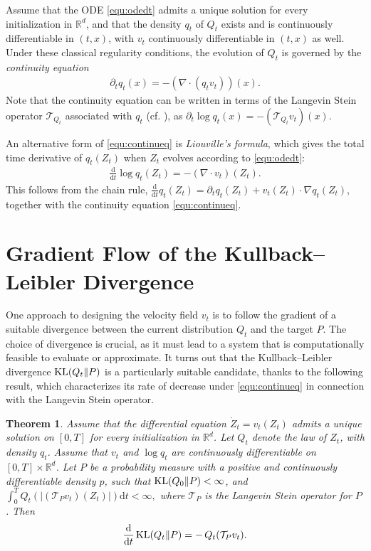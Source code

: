 \documentclass[12pt,paper=letter]{scrreprt}
\newtheorem{theorem}{Theorem}[chapter]
\newcommand{\RR}{\mathbb{R}}
\def\KL#1#2{\textnormal{KL}({#1}\Vert{#2})}
\newcommand{\df}{\mathrm{d}}
\begin{document}
Assume that the ODE \eqref{equ:odedt} admits a unique solution for every initialization in $\RR^d$,
and that the density $q_t$ of $Q_t$ exists and is continuously differentiable in $(t,x)$, with
$v_t$ continuously differentiable in $(t,x)$ as well.
Under these classical regularity conditions, the evolution of $Q_t$ is governed by the
\emph{continuity equation}
\begin{align}\label{equ:continueq}
\partial_t q_t(x)
=
- (\nabla \cdot (q_t v_t))(x).
\end{align}
Note that the continuity equation can be written in terms of the Langevin Stein operator $\mathcal{T}_{Q_t}$ associated with $q_t$ (cf. ), as
$\partial_t \log q_t(x) = - (\mathcal{T}_{Q_t} v_t)(x)$.


An alternative form of \eqref{equ:continueq} is \emph{Liouville’s formula}, which gives the total time derivative of $q_t(Z_t)$ when $Z_t$ evolves according to \eqref{equ:odedt}:
\begin{align}
\label{equ:liouville}
\frac{\df}{\df t} \log q_t(Z_t) = - (\nabla \!\cdot v_t)(Z_t).
\end{align}
This follows from the chain rule,
$\frac{\df}{\df t} q_t(Z_t) = \partial_t q_t(Z_t) + v_t(Z_t) \cdot \nabla q_t(Z_t)$,  
together with the continuity equation \eqref{equ:continueq}.

 

\section{Gradient Flow of the Kullback--Leibler Divergence}

One approach to designing the velocity field $v_t$ is to follow the gradient of a suitable divergence between the current distribution $Q_t$ and the target $P$.
The choice of divergence is crucial, as it must lead to a system that is computationally feasible to evaluate or approximate.
It turns out that the Kullback--Leibler divergence $\KL{Q_t}{P}$ is a particularly suitable candidate, thanks to the following result, which characterizes its rate of decrease under \eqref{equ:continueq} in connection with the Langevin Stein operator.


\begin{theorem}\label{thm: deriv KL}
Assume that the differential equation $\dot Z_t = v_t(Z_t)$ admits a unique solution on $[0,T]$ for every initialization in $\RR^d$.
Let $Q_t$ denote the law of $Z_t$, with density $q_t$.
Assume that $v_t$ and $\log q_t$ are continuously differentiable on $[0,T] \times \RR^d$.
Let $P$ be a probability measure with a positive and continuously differentiable density $p$, such that $\KL{Q_0}{P} < \infty$, and 
$\int_0^T Q_t(|(\mathcal{T}_P v_t)(Z_t)|)\df t < \infty,$ 
where $\mathcal{T}_P$ is the Langevin Stein operator for $P$.
Then
\begin{align}
\frac{\df}{\df t}\,
\KL{Q_t}{P}
=
-%
\,Q_t(\mathcal T_P v_t). 
\end{align} 
\end{theorem}
\end{document}
